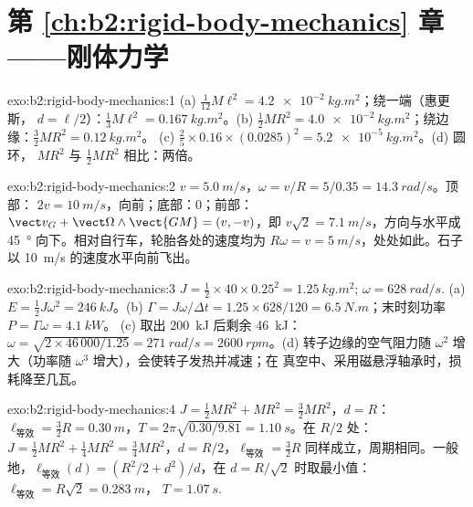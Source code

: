  \section*{第 \ref{ch:b2:rigid-body-mechanics} 章——刚体力学}

\begin{solution}{exo:b2:rigid-body-mechanics:1}
(a) $\tfrac1{12}M\ell^2 = \qty{4.2e-2}{kg.m^2}$；绕一端（惠更斯，
$d = \ell/2$）：$\tfrac13M\ell^2 = \qty{0.167}{kg.m^2}$。(b) $\tfrac12MR^2 =
\qty{4.0e-2}{kg.m^2}$；绕边缘：$\tfrac32MR^2 = \qty{0.12}{kg.m^2}$。
(c) $\tfrac25 \times 0.16 \times (0.0285)^2 = \qty{5.2e-5}{kg.m^2}$。(d) 圆环，
$MR^2$ 与 $\tfrac12MR^2$ 相比：两倍。
\end{solution}

\begin{solution}{exo:b2:rigid-body-mechanics:2}
$v = \qty{5.0}{m/s}$，$\omega = v/R = 5/0.35 = \qty{14.3}{rad/s}$。顶部：
$2v = \qty{10}{m/s}$，向前；底部：$0$；前部：$\vect v_G + \vect\Omega
\wedge\vect{GM} = (v, -v)$，即 $v\sqrt2 = \qty{7.1}{m/s}$，方向与水平成
\qty{45}{\degree} 向下。相对自行车，轮胎各处的速度均为
$R\omega = v = \qty{5}{m/s}$，处处如此。石子以 \qty{10}{m/s}
的速度水平向前飞出。
\end{solution}

\begin{solution}{exo:b2:rigid-body-mechanics:3}
$J = \tfrac12 \times 40 \times 0.25^2 = \qty{1.25}{kg.m^2}$; $\omega = \qty{628}{rad/s}$.
(a) $E = \tfrac12J\omega^2 = \qty{246}{kJ}$。(b) $\Gamma = J\omega/\Delta t =
1.25 \times 628/120 = \qty{6.5}{N.m}$；末时刻功率 $P = \Gamma\omega = \qty{4.1}{kW}$。
(c) 取出 \qty{200}{kJ} 后剩余 \qty{46}{kJ}：$\omega = \sqrt{2 \times 46\,000/1.25}
= \qty{271}{rad/s} = \qty{2600}{rpm}$。(d) 转子边缘的空气阻力随
$\omega^2$ 增大（功率随 $\omega^3$ 增大），会使转子发热并减速；在
真空中、采用磁悬浮轴承时，损耗降至几瓦。
\end{solution}

\begin{solution}{exo:b2:rigid-body-mechanics:4}
$J = \tfrac12MR^2 + MR^2 = \tfrac32MR^2$，$d = R$：$\ell_{\text{等效}} = \tfrac32R
= \qty{0.30}{m}$，$T = 2\pi\sqrt{0.30/9.81} = \qty{1.10}{s}$。在 $R/2$ 处：$J =
\tfrac12MR^2 + \tfrac14MR^2 = \tfrac34MR^2$，$d = R/2$，$\ell_{\text{等效}} =
\tfrac32R$ 同样成立，周期相同。一般地，$\ell_{\text{等效}}(d) = (R^2/2 +
d^2)/d$，在 $d = R/\sqrt2$ 时取最小值：$\ell_{\text{等效}} = R\sqrt2 = \qty{0.283}{m}$，
$T = \qty{1.07}{s}$.
\end{solution}

